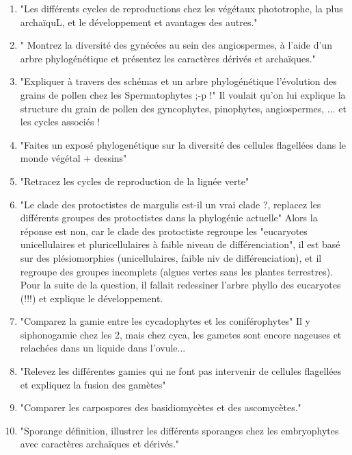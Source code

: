 \begin{enumerate}
	\item "Les différents cycles de reproductions chez les végétaux phototrophe, la plus archaïquL, et le développement et avantages des autres."

	\item " Montrez la diversité des gynécées au sein des angiospermes, à l'aide d'un arbre phylogénétique et présentez les caractères dérivés et archaïques."

	\item "Expliquer à travers des schémas et un arbre phylogénétique l'évolution des grains de pollen chez les Spermatophytes ;-p !"  Il voulait qu'on lui explique la structure du grain de pollen des gyncophytes, pinophytes, angiospermes, ... et les cycles associés !

	\item "Faites un exposé phylogenétique sur la diversité des cellules flagellées dans le monde végétal + dessins"

	\item "Retracez les cycles de reproduction de la lignée verte"

	\item "Le clade des protoctistes de margulis est-il un vrai clade ?, replacez les différents groupes des protoctistes dans la phylogénie actuelle"
Alors la réponse est non, car le clade des protoctiste regroupe les "eucaryotes unicellulaires et pluricellulaires à faible niveau de différenciation", il est basé sur des plésiomorphies (unicellulaires, faible niv de différenciation), et il regroupe des groupes incomplets (algues vertes sans les plantes terrestres). Pour la suite de la question, il fallait redessiner l'arbre phyllo des eucaryotes (!!!) et explique le développement.

	\item "Comparez la gamie entre les cycadophytes et les coniférophytes" 
Il y siphonogamie chez les 2, mais chez cyca, les gametes sont encore nageuses et
relachées dans un liquide dans l'ovule...

	\item "Relevez les différentes gamies qui ne font pas intervenir de cellules flagellées et expliquez la fusion des gamètes"

	\item "Comparer les carpospores des basidiomycètes et des ascomycètes."

	\item "Sporange définition, illustrer les différents sporanges chez les embryophytes avec caractères archaïques et dérivés."


\end{enumerate}
